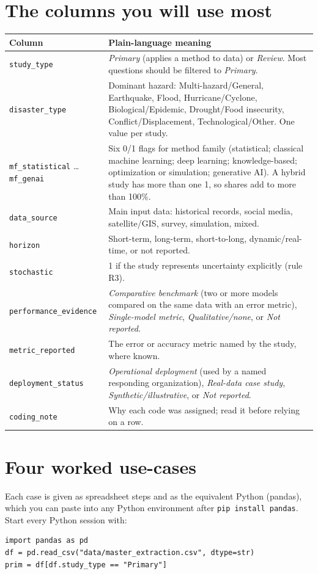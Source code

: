 \documentclass[11pt,a4paper]{article}
\begin{document}
\section{The columns you will use most}
\begin{longtable}{@{}L{3.6cm}L{11.4cm}@{}}
\toprule \textbf{Column} & \textbf{Plain-language meaning} \\ \midrule \endhead
\texttt{study\_type} & \emph{Primary} (applies a method to data) or \emph{Review}. Most questions should be filtered to \emph{Primary}. \\
\texttt{disaster\_type} & Dominant hazard: Multi-hazard/General, Earthquake, Flood, Hurricane/Cyclone, Biological/Epidemic, Drought/Food insecurity, Conflict/Displacement, Technological/Other. One value per study. \\
\texttt{mf\_statistical} \ldots{} \texttt{mf\_genai} & Six 0/1 flags for method family (statistical; classical machine learning; deep learning; knowledge-based; optimization or simulation; generative AI). A hybrid study has more than one 1, so shares add to more than 100\%. \\
\texttt{data\_source} & Main input data: historical records, social media, satellite/GIS, survey, simulation, mixed. \\
\texttt{horizon} & Short-term, long-term, short-to-long, dynamic/real-time, or not reported. \\
\texttt{stochastic} & 1 if the study represents uncertainty explicitly (rule R3). \\
\texttt{performance\_evidence} & \emph{Comparative benchmark} (two or more models compared on the same data with an error metric), \emph{Single-model metric}, \emph{Qualitative/none}, or \emph{Not reported}. \\
\texttt{metric\_reported} & The error or accuracy metric named by the study, where known. \\
\texttt{deployment\_status} & \emph{Operational deployment} (used by a named responding organization), \emph{Real-data case study}, \emph{Synthetic/illustrative}, or \emph{Not reported}. \\
\texttt{coding\_note} & Why each code was assigned; read it before relying on a row. \\
\bottomrule
\end{longtable}

\section{Four worked use-cases}
Each case is given as spreadsheet steps and as the equivalent Python (pandas), which you can paste into any Python environment after \texttt{pip install pandas}. Start every Python session with:
\begin{Verbatim}
import pandas as pd
df = pd.read_csv("data/master_extraction.csv", dtype=str)
prim = df[df.study_type == "Primary"]
\end{Verbatim}
\end{document}
